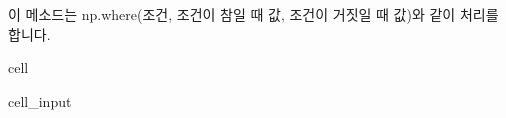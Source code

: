 \documentclass[letterpaper,10pt,english]{jupyterBook}
\begin{document}
\begin{sphinxVerbatim}[commandchars=\\\{\}]
\PYG{p}{[}\PYG{p}{]}    
\end{sphinxVerbatim}

\sphinxAtStartPar
이 메소드는 np.where(조건, 조건이 참일 때 값, 조건이 거짓일 때 값)와 같이 처리를 합니다.

\begin{sphinxuseclass}{cell}\begin{sphinxVerbatimInput}

\begin{sphinxuseclass}{cell_input}
\begin{sphinxVerbatim}[commandchars=\\\{\}]
  

   \PYG{p}{[}\PYG{p}{]}  
    

\end{sphinxVerbatim}
\end{sphinxuseclass}
\end{sphinxVerbatimInput}
\end{sphinxuseclass}
\end{document}
